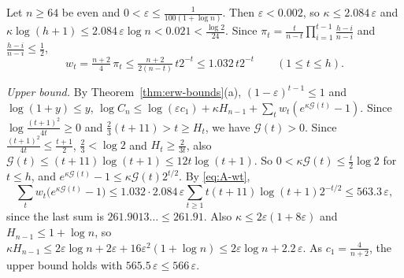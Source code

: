 Let $n\ge64$ be even and $0<\varepsilon\le\frac1{100(1+\log n)}$. Then
$\varepsilon<0.002$, so $\kappa\le2.084\,\varepsilon$ and
$\kappa\log(h+1)\le2.084\,\varepsilon\log n<0.021<\frac{\log2}{24}$. Since
$\pi_t=\frac t{n-t}\prod_{i=1}^{t-1}\frac{h-i}{n-i}$ and
$\frac{h-i}{n-i}\le\frac12$,
\begin{equation}\label{eq:A-wt}
 w_t=\tfrac{n+2}4\,\pi_t\le\tfrac{n+2}{2(n-t)}\,t2^{-t}\le1.032\,t2^{-t}
 \qquad(1\le t\le h).
\end{equation}

\emph{Upper bound.} By Theorem~\ref{thm:erw-bounds}(a),
$(1-\varepsilon)^{t-1}\le1$ and $\log(1+y)\le y$,
$\log C_n\le\log(\varepsilon c_1)+\kappa H_{n-1}
+\sum_tw_t(e^{\kappa\mathcal G(t)}-1)$. Since
$\log\frac{(t+1)^2}{4t}\ge0$ and $\frac23(t+11)>t\ge H_t$, we have
$\mathcal G(t)>0$. Since $\frac{(t+1)^2}{4t}\le\frac{t+1}2$,
$\frac23<\log2$ and $H_t\ge\frac2{3t}$, also
$\mathcal G(t)\le(t+11)\log(t+1)\le12t\log(t+1)$. So
$0<\kappa\mathcal G(t)\le\frac t2\log2$ for $t\le h$, and
$e^{\kappa\mathcal G(t)}-1\le\kappa\mathcal G(t)2^{t/2}$. By \eqref{eq:A-wt},
\[
 \sum_tw_t\bigl(e^{\kappa\mathcal G(t)}-1\bigr)
 \le1.032\cdot2.084\,\varepsilon\sum_{t\ge1}t(t+11)\log(t+1)2^{-t/2}
 \le563.3\,\varepsilon,
\]
since the last sum is $261.9013\ldots\le261.91$. Also
$\kappa\le2\varepsilon(1+8\varepsilon)$ and $H_{n-1}\le1+\log n$, so
$\kappa H_{n-1}\le2\varepsilon\log n+2\varepsilon+16\varepsilon^2(1+\log n)
\le2\varepsilon\log n+2.2\,\varepsilon$. As $c_1=\frac4{n+2}$, the upper
bound holds with $565.5\,\varepsilon\le566\,\varepsilon$.

